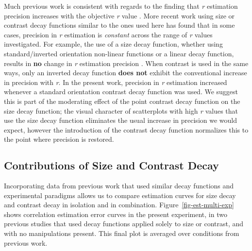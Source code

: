 \documentclass[manuscript, review, anonymous, screen]{acmart}
\begin{document}
Much previous work is consistent with regards to the finding that
\emph{r} estimation precision increases with the objective \emph{r}
value
\citep{rensink_2010, rensink_2012, rensink_2014, rensink_2017, doherty_2007}.
More recent work using size or contrast decay functions similar to the
ones used here \citep{strain_2023, strain_2023b} has found that in some
cases, precision in \emph{r} estimation is \emph{constant} across the
range of \emph{r} values investigated. For example, the use of a size
decay function, whether using standard/inverted orientation non-linear
functions or a linear decay function, results in \textbf{no} change in
\emph{r} estimation precision \citep{strain_2023b}. When contrast is
used in the same ways, only an inverted decay function \textbf{does not}
exhibit the conventional increase in precision with \emph{r}. In the
present work, precision in \emph{r} estimation increased whenever a
standard orientation contrast decay function was used. We suggest this
is part of the moderating effect of the point contrast decay function on
the size decay function; the visual character of scatterplots with high
\emph{r} values that use the size decay function eliminates the usual
increase in precision we would expect, however the introduction of the
contrast decay function normalizes this to the point where precision is
restored.

\hypertarget{contributions-of-size-and-contrast-decay}{%
\subsection{Contributions of Size and Contrast
Decay}\label{contributions-of-size-and-contrast-decay}}

Incorporating data from previous work \citep{strain_2023, strain_2023b}
that used similar decay functions and experimental paradigms allows us
to compare estimation curves for size decay and contrast decay in
isolation and in combination. Figure~\ref{fig-est-multi-exp} shows correlation estimation error curves in the present experiment,
in two previous studies that used decay functions applied solely to size or
contrast, and with no manipulations present. This final plot is averaged over
conditions from previous work.
\end{document}
